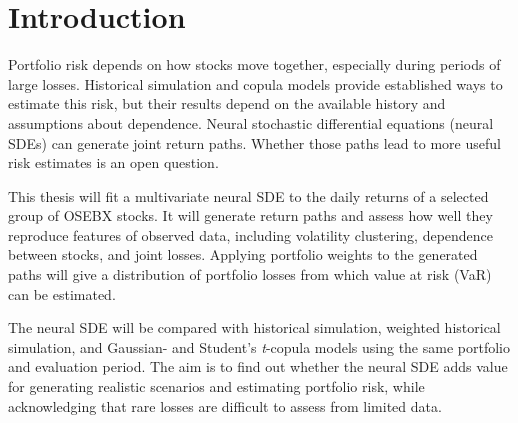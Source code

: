 \section{Introduction}

Portfolio risk depends on how stocks move together, especially during periods of
large losses. Historical simulation and copula models provide established ways
to estimate this risk, but their results depend on the available history and
assumptions about dependence. Neural stochastic differential equations (neural
SDEs) can generate joint return paths. Whether those paths lead to more useful
risk estimates is an open question.

This thesis will fit a multivariate neural SDE to the daily returns of a selected
group of OSEBX stocks. It will generate return paths and assess how well they
reproduce features of observed data, including volatility clustering, dependence
between stocks, and joint losses. Applying portfolio weights to the generated
paths will give a distribution of portfolio losses from which value at risk
(VaR) can be estimated.

The neural SDE will be compared with historical simulation, weighted historical
simulation, and Gaussian- and Student's \emph{t}-copula models using the same
portfolio and evaluation period. The aim is to find out whether the neural SDE
adds value for generating realistic scenarios and estimating portfolio risk,
while acknowledging that rare losses are difficult to assess from limited data.
